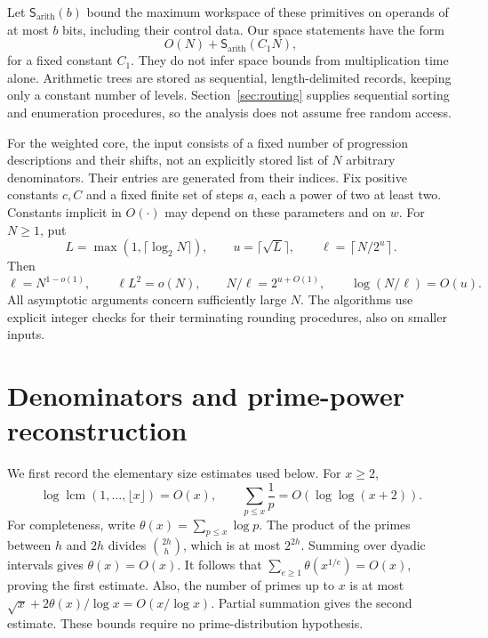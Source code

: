 \documentclass[11pt]{article}
\numberwithin{equation}{section}
\theoremstyle{definition}
\newcommand{\lcm}{\operatorname{lcm}}
\newcommand{\Sarith}{\mathsf S_{\mathrm{arith}}}
\begin{document}
Let $\Sarith(b)$ bound the maximum workspace of these primitives on
operands of at most $b$ bits, including their control data. Our space
statements have the form
\begin{equation}\label{eq:space-model}
 O(N)+\Sarith(C_1N),
\end{equation}
for a fixed constant $C_1$. They do not infer space bounds from
multiplication time alone. Arithmetic trees are stored as sequential,
length-delimited records, keeping only a constant number of levels.
Section~\ref{sec:routing} supplies sequential sorting and enumeration
procedures, so the analysis does not assume free random access.

For the weighted core, the input consists of a fixed number of
progression descriptions and their shifts, not an explicitly stored
list of $N$ arbitrary denominators. Their entries are generated from
their indices. Fix positive constants $c,C$ and a fixed finite set
of steps $a$, each a power of two at least two. Constants implicit
in $O(\cdot)$ may depend on these parameters and on $w$.
For $N\ge1$, put
\begin{equation}\label{eq:parameters}
 L=\max(1,\lceil\log_2N\rceil),\qquad
 u=\lceil\sqrt L\rceil,\qquad
 \ell=\left\lceil N/2^u\right\rceil.
\end{equation}
Then
\begin{equation}\label{eq:parameter-sizes}
 \ell=N^{1-o(1)},\qquad \ell L^2=o(N),\qquad
 N/\ell=2^{u+O(1)},\qquad \log(N/\ell)=O(u).
\end{equation}
All asymptotic arguments concern sufficiently large $N$. The
algorithms use explicit integer checks for their terminating
rounding procedures, also on smaller inputs.

\section{Denominators and prime-power reconstruction}
\label{sec:reconstruction}

We first record the elementary size estimates used below. For
$x\ge2$,
\begin{equation}\label{eq:prime-bounds}
 \log\lcm(1,\ldots,\lfloor x\rfloor)=O(x),
 \qquad \sum_{p\le x}\frac1p=O(\log\log(x+2)).
\end{equation}
For completeness, write
$\theta(x)=\sum_{p\le x}\log p$. The product of the primes between
$h$ and $2h$ divides $\binom{2h}{h}$, which is at most $2^{2h}$.
Summing over dyadic intervals gives $\theta(x)=O(x)$.
It follows that
$\sum_{e\ge1}\theta(x^{1/e})=O(x)$, proving the first estimate.
Also, the number of primes up to $x$ is at most
$\sqrt{x}+2\theta(x)/\log x=O(x/\log x)$.
Partial summation gives the second estimate. These bounds require
no prime-distribution hypothesis.
\end{document}
